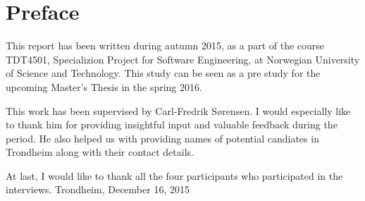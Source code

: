 
\section*{Preface}
This report has been written during autumn 2015, as a part of the course TDT4501, Specializion Project for Software Engineering, at Norwegian University of Science and Technology. This study can be seen as a pre study for the upcoming Master's Thesis in the spring 2016.

This work has been supervised by Carl-Fredrik Sørensen. I would especially like to thank him for providing insightful input and valuable feedback during the period. He also helped us with providing names of potential candiates in Trondheim along with their contact details.

At last, I would like to thank all the four participants who participated in the interviews.
\newline
\newline
Trondheim, December 16, 2015
